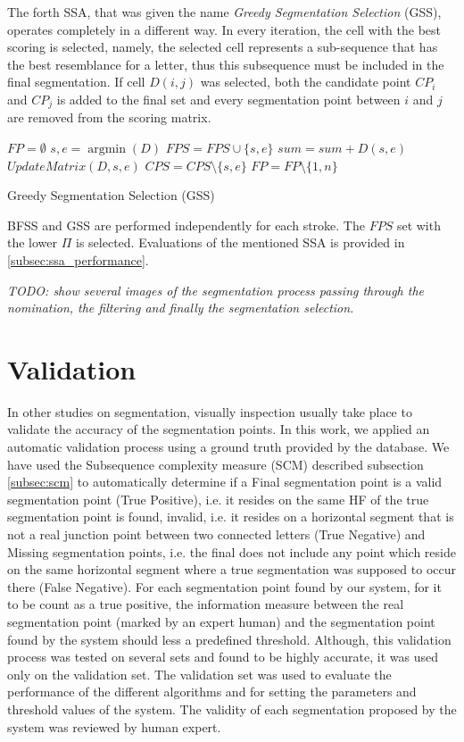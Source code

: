 \documentclass[journal,compsoc]{IEEEtran}
\begin{document}
The forth SSA, that was given the name \emph{Greedy Segmentation Selection} (GSS), operates completely in a different way. In every iteration, the cell with the best scoring is selected, namely, the selected cell represents a sub-sequence that has the best resemblance for a letter, thus this subsequence must be included in the final segmentation. If cell $D(i,j)$ was selected, both the candidate point $CP_{i}$ and $CP_{j}$ is added to the final set and every segmentation point between $i$ and $j$ are removed from the scoring matrix. 

\begin{algorithm}
$FP=\emptyset$\;
{
	${s,e} = \mathop {\arg \min}(D)$\;
	$FPS = FPS \cup \{s,e\}$\;
	$sum = sum + D(s,e)$\;
	$UpdateMatrix(D,s,e)$\;
	$CPS = CPS\setminus\{s,e\}$\;
}
$FP=FP\setminus\{1,n\}$\;

\caption{Greedy Segmentation Selection (GSS)}
\label{alg:gss}
\end{algorithm}

BFSS and GSS are performed independently for each stroke. The $FPS$ set with the lower $\Pi$ is selected. Evaluations of the mentioned SSA is provided in \ref{subsec:ssa_performance}. 

\emph{TODO: show several images of the segmentation process passing through the nomination, the filtering and finally the segmentation selection.}

\section{Validation}
\label{sec:validation}
In other studies on segmentation, visually inspection usually take place to validate the accuracy of the segmentation points. In this work, we applied an automatic validation process using a ground truth provided by the database. We have used the Subsequence complexity measure (SCM) described subsection \ref{subsec:scm} to automatically determine if a Final segmentation point is a valid segmentation point (True Positive), i.e. it resides on the same HF of the true segmentation point is found, invalid, i.e. it resides on a horizontal segment that is not a real junction point between two connected letters (True Negative) and Missing segmentation points, i.e. the final does not include any point which reside on the same horizontal segment where a true segmentation was supposed to occur there (False Negative).  
For each segmentation point found by our system, for it to be count as a true positive, the information measure between the real segmentation point (marked by an expert human) and the segmentation point found by the system should less a predefined threshold.
Although, this validation process was tested on several sets and found to be highly accurate, it was used only on the validation set. The validation set was used to evaluate the performance of the different algorithms and for setting the parameters and threshold values of the system. The validity of each segmentation proposed by the system was reviewed by human expert.  
\end{document}

